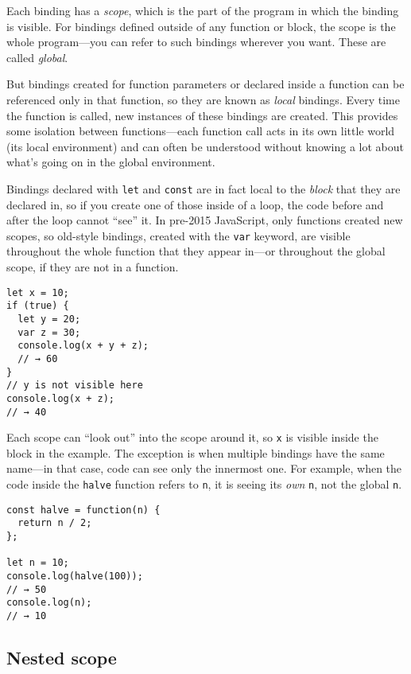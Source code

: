 Each binding has a \emph{scope}, which is the part of the program in which the binding is visible. For bindings defined outside of any function or block, the scope is the whole program—you can refer to such bindings wherever you want. These are called \emph{global}.

But bindings created for function parameters or declared inside a function can be referenced only in that function, so they are known as \emph{local} bindings. Every time the function is called, new instances of these bindings are created. This provides some isolation between functions—each function call acts in its own little world (its local environment) and can often be understood without knowing a lot about what's going on in the global environment.

Bindings declared with \lstinline`let` and \lstinline`const` are in fact local to the \emph{block} that they are declared in, so if you create one of those inside of a loop, the code before and after the loop cannot ``see'' it. In pre-2015 JavaScript, only functions created new scopes, so old-style bindings, created with the \lstinline`var` keyword, are visible throughout the whole function that they appear in—or throughout the global scope, if they are not in a function.

\begin{lstlisting}
let x = 10;
if (true) {
  let y = 20;
  var z = 30;
  console.log(x + y + z);
  // → 60
}
// y is not visible here
console.log(x + z);
// → 40
\end{lstlisting}
\noindent{}

Each scope can ``look out'' into the scope around it, so \lstinline`x` is visible inside the block in the example. The exception is when multiple bindings have the same name—in that case, code can see only the innermost one. For example, when the code inside the \lstinline`halve` function refers to \lstinline`n`, it is seeing its \emph{own} \lstinline`n`, not the global \lstinline`n`.

\begin{lstlisting}
const halve = function(n) {
  return n / 2;
};

let n = 10;
console.log(halve(100));
// → 50
console.log(n);
// → 10
\end{lstlisting}
\noindent

\label{functions.scoping}\subsection{Nested scope}

